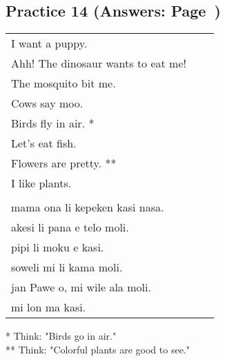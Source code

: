 \subsection*{Practice 14 (Answers: Page~\pageref{'living_things'})}
%
\begin{supertabular}{p{5,5cm}|ll}
I want a puppy. &&   \\ %
Ahh! The dinosaur wants to eat me!  &&  \\ %
The mosquito bit me.  &&  \\ %
Cows say moo.  &&  \\ %
Birds fly in air. * &&  \\ %
Let's eat fish.  &&  \\ %
Flowers are pretty. ** &&  \\ %
I like plants. &&   \\ %
 && \\ %
mama ona li kepeken kasi nasa.  &&  \\ %
akesi li pana e telo moli. &&  \\  %
pipi li moku e kasi.  &&  \\ %
soweli mi li kama moli.  &&  \\ %
jan Pawe o, mi wile ala moli. && \\   %
mi lon ma kasi. &&   \\ %
\end{supertabular} 

* Think: "Birds go in air." \\
** Think: "Colorful plants are good to see." 
